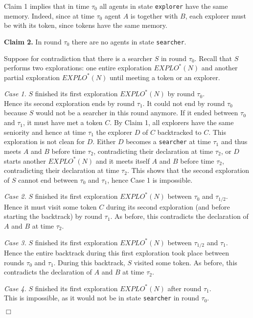\documentclass[11pt]{article}
\newcommand{\qed}{\hfill $\Box$ \bigbreak}
\newenvironment{proof}{\noindent {\bf Proof.}}{\qed}
\begin{document}
\begin{proof}
Claim 1 implies that in time $\tau_0$ all agents in state {\tt explorer} have the same memory. Indeed, since at time $\tau_0$ agent $A$ is together with $B$, each explorer
must be with its token, since tokens have the same memory.

 \vspace*{0.3cm}
  \noindent
{\bf Claim 2.} In round $\tau_0$ there are no agents in state {\tt searcher}.

Suppose for contradiction that there is a searcher $S$ in round $\tau_0$. Recall that $S$ performs two explorations: one entire exploration $EXPLO^*(N)$ 
and another partial exploration  $EXPLO^*(N)$ until meeting a token or an explorer.

  \noindent
{\em Case 1.} $S$ finished its first exploration $EXPLO^*(N)$ by round $\tau_0$.\\
Hence its second exploration ends by round $\tau_1$. It could not end by round $\tau_0$ because $S$ would not be a searcher in this round anymore.
If it ended between $\tau_0$ and $\tau_1$, it must have met a token $C$. By Claim 1, all explorers have the same seniority and hence at time $\tau_1$ the 
explorer $D$ of $C$ backtracked to $C$. This exploration is not clean for $D$. Either $D$ becomes a {\tt searcher} at time $\tau _1$ and thus meets $A$ and $B$
before time $\tau_2$, contradicting their declaration at time $\tau_2$, or $D$ starts another  $EXPLO^*(N)$ and it meets itself $A$ and $B$
before time $\tau_2$, contradicting their declaration at time $\tau_2$. This shows that the second exploration of $S$ cannot end between $\tau_0$ and $\tau_1$,
hence Case 1 is impossible.

  \noindent
{\em Case 2.} $S$ finished its first exploration $EXPLO^*(N)$ between $\tau_0$ and $\tau_{1/2}$.\\
Hence it must visit some token $C$ during its second exploration (and before starting the backtrack) by round $\tau_1$. As before, this contradicts 
the declaration of $A$ and $B$ at time $\tau_2$.

  \noindent
{\em Case 3.} $S$ finished its first exploration $EXPLO^*(N)$ between  $\tau_{1/2}$ and $\tau_1$.\\
Hence the entire backtrack during this first exploration took place between rounds  $\tau_0$ and $\tau_1$. During this backtrack, $S$ visited some token.
As before, this contradicts 
the declaration of $A$ and $B$ at time $\tau_2$.

  \noindent
{\em Case 4.} $S$ finished its first exploration $EXPLO^*(N)$ after round $\tau_1$.\\
This is impossible, as it would not be in state {\tt searcher} in round $\tau_0$.


\end{proof}
\end{document}
